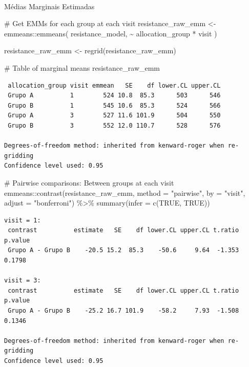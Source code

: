 \documentclass[
  letterpaper,
  DIV=11,
  numbers=noendperiod]{scrartcl}
\makeatletter
\let\oldparagraph\paragraph
\renewcommand{\paragraph}{
    \@ifstar
      \xxxParagraphStar
      \xxxParagraphNoStar
  }
\newcommand{\xxxParagraphStar}[1]{\oldparagraph*{#1}\mbox{}}
\newcommand{\xxxParagraphNoStar}[1]{\oldparagraph{#1}\mbox{}}
\newenvironment{Shaded}{\begin{snugshade}}{\end{snugshade}}
\newcommand{\AttributeTok}[1]{\textcolor[rgb]{0.40,0.45,0.13}{#1}}
\newcommand{\CommentTok}[1]{\textcolor[rgb]{0.37,0.37,0.37}{#1}}
\newcommand{\ConstantTok}[1]{\textcolor[rgb]{0.56,0.35,0.01}{#1}}
\newcommand{\FunctionTok}[1]{\textcolor[rgb]{0.28,0.35,0.67}{#1}}
\newcommand{\NormalTok}[1]{\textcolor[rgb]{0.00,0.23,0.31}{#1}}
\newcommand{\OtherTok}[1]{\textcolor[rgb]{0.00,0.23,0.31}{#1}}
\newcommand{\SpecialCharTok}[1]{\textcolor[rgb]{0.37,0.37,0.37}{#1}}
\newcommand{\StringTok}[1]{\textcolor[rgb]{0.13,0.47,0.30}{#1}}
\makeatother
\begin{document}
\paragraph{Médias Marginais
Estimadas}\label{muxe9dias-marginais-estimadas-19}

\begin{Shaded}
\begin{Highlighting}[]
\CommentTok{\# Get EMMs for each group at each visit}
\NormalTok{resistance\_raw\_emm }\OtherTok{\textless{}{-}}\NormalTok{ emmeans}\SpecialCharTok{::}\FunctionTok{emmeans}\NormalTok{(}
\NormalTok{    resistance\_model, }
    \SpecialCharTok{\textasciitilde{}}\NormalTok{ allocation\_group }\SpecialCharTok{*}\NormalTok{ visit}
\NormalTok{)}

\NormalTok{resistance\_raw\_emm }\OtherTok{\textless{}{-}} \FunctionTok{regrid}\NormalTok{(resistance\_raw\_emm)}

\CommentTok{\# Table of marginal means}
\NormalTok{resistance\_raw\_emm}
\end{Highlighting}
\end{Shaded}

\begin{verbatim}
 allocation_group visit emmean   SE    df lower.CL upper.CL
 Grupo A          1        524 10.8  85.3      503      546
 Grupo B          1        545 10.6  85.3      524      566
 Grupo A          3        527 11.6 101.9      504      550
 Grupo B          3        552 12.0 110.7      528      576

Degrees-of-freedom method: inherited from kenward-roger when re-gridding 
Confidence level used: 0.95 
\end{verbatim}

\begin{Shaded}
\begin{Highlighting}[]
\CommentTok{\# Pairwise comparisons: Between groups at each visit}
\NormalTok{emmeans}\SpecialCharTok{::}\FunctionTok{contrast}\NormalTok{(resistance\_raw\_emm, }\AttributeTok{method =} \StringTok{"pairwise"}\NormalTok{, }\AttributeTok{by =} \StringTok{"visit"}\NormalTok{, }\AttributeTok{adjust =} \StringTok{"bonferroni"}\NormalTok{) }\SpecialCharTok{\%\textgreater{}\%} \FunctionTok{summary}\NormalTok{(}\AttributeTok{infer =} \FunctionTok{c}\NormalTok{(}\ConstantTok{TRUE}\NormalTok{, }\ConstantTok{TRUE}\NormalTok{))}
\end{Highlighting}
\end{Shaded}

\begin{verbatim}
visit = 1:
 contrast          estimate   SE    df lower.CL upper.CL t.ratio p.value
 Grupo A - Grupo B    -20.5 15.2  85.3    -50.6     9.64  -1.353  0.1798

visit = 3:
 contrast          estimate   SE    df lower.CL upper.CL t.ratio p.value
 Grupo A - Grupo B    -25.2 16.7 101.9    -58.2     7.93  -1.508  0.1346

Degrees-of-freedom method: inherited from kenward-roger when re-gridding 
Confidence level used: 0.95 
\end{verbatim}
\end{document}

